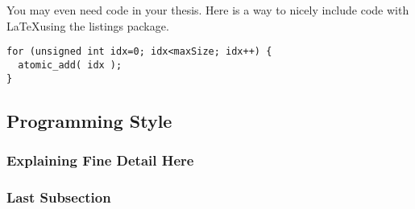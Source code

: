 You may even need code in your thesis. Here is a way to nicely include code with \LaTeX using the listings package.
\begin{lstlisting}
for (unsigned int idx=0; idx<maxSize; idx++) {
  atomic_add( idx );
}
\end{lstlisting}

\subsection{Programming Style}
\subsubsection{Explaining Fine Detail Here}

\subsubsection{Last Subsection}
